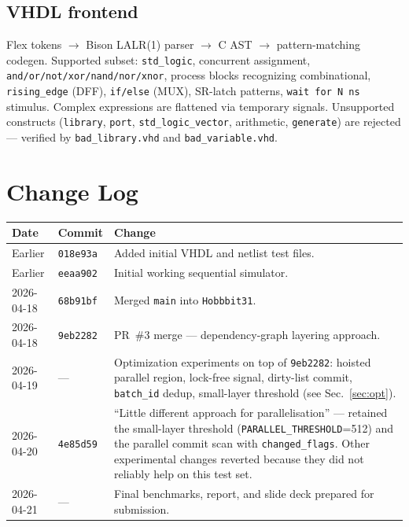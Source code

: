 \documentclass[9pt,a4paper]{article}
\begin{document}
\subsection{VHDL frontend}
Flex tokens $\to$ Bison LALR(1) parser $\to$ C AST $\to$ pattern-matching codegen. Supported subset: \texttt{std\_logic}, concurrent assignment, \texttt{and/or/not/xor/nand/nor/xnor}, process blocks recognizing combinational, \texttt{rising\_edge} (DFF), \texttt{if/else} (MUX), SR-latch patterns, \texttt{wait for N ns} stimulus. Complex expressions are flattened via temporary signals. Unsupported constructs (\texttt{library}, \texttt{port}, \texttt{std\_logic\_vector}, arithmetic, \texttt{generate}) are rejected — verified by \texttt{bad\_library.vhd} and \texttt{bad\_variable.vhd}.

\newpage

\section{Change Log}

\begin{longtable}{@{}p{2.2cm}p{2.6cm}p{10cm}@{}}
\toprule
\textbf{Date} & \textbf{Commit} & \textbf{Change} \\
\midrule \endhead
Earlier       & \texttt{018e93a} & Added initial VHDL and netlist test files. \\
Earlier       & \texttt{eeaa902} & Initial working sequential simulator. \\
2026-04-18    & \texttt{68b91bf} & Merged \texttt{main} into \texttt{Hobbbit31}. \\
2026-04-18    & \texttt{9eb2282} & PR~\#3 merge — dependency-graph layering approach. \\
2026-04-19    & —               & Optimization experiments on top of \texttt{9eb2282}: hoisted parallel region, lock-free signal, dirty-list commit, \texttt{batch\_id} dedup, small-layer threshold (see Sec.~\ref{sec:opt}). \\
2026-04-20    & \texttt{4e85d59} & ``Little different approach for parallelisation'' — retained the small-layer threshold (\texttt{PARALLEL\_THRESHOLD}=512) and the parallel commit scan with \texttt{changed\_flags}. Other experimental changes reverted because they did not reliably help on this test set. \\
2026-04-21    & —               & Final benchmarks, report, and slide deck prepared for submission. \\
\bottomrule
\end{longtable}
\end{document}
